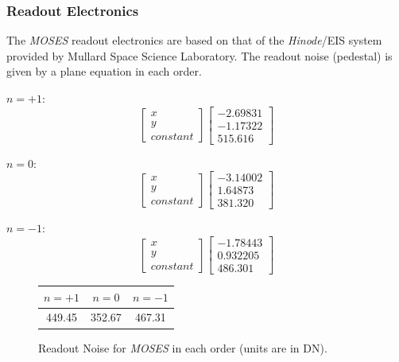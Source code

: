 \documentclass[10pt,a4paper,titlepage]{article}
\begin{document}
		\subsubsection{Readout Electronics}
			The \textit{MOSES} readout electronics are based on that of the \textit{Hinode}/EIS system provided by Mullard Space Science Laboratory. The readout noise (pedestal) is given by a plane equation in each order.
			
			$n = +1:$
			\begin{equation}	
				\begin{bmatrix} x\\ y\\ constant \end{bmatrix}
				\begin{bmatrix} -2.69831\\ -1.17322\\ 515.616 \end{bmatrix}
			\end{equation}
			
			$n = 0:$
			\begin{equation}
			\begin{bmatrix}  x\\ y\\ constant \end{bmatrix}
			\begin{bmatrix} -3.14002\\ 1.64873\\ 381.320 \end{bmatrix}
			\end{equation}
			
			$n = -1:$
			\begin{equation}
			\begin{bmatrix}  x\\ y\\ constant \end{bmatrix}
			\begin{bmatrix} -1.78443\\ 0.932205\\ 486.301 \end{bmatrix}
			\end{equation}
			
			\begin{figure}[H]
			\begin{center}
				\begin{tabular}[H]{| c | c | c|}
					\hline
					$n = +1$ & $n = 0$ & $n = -1$\\
					\hline
					449.45 & 352.67 & 467.31 \\
					\hline
				\end{tabular}
			\caption{Readout Noise for \textit{MOSES} in each order (units are in DN).}
			\centering
			\end{center}
			\end{figure}
			
\end{document}
